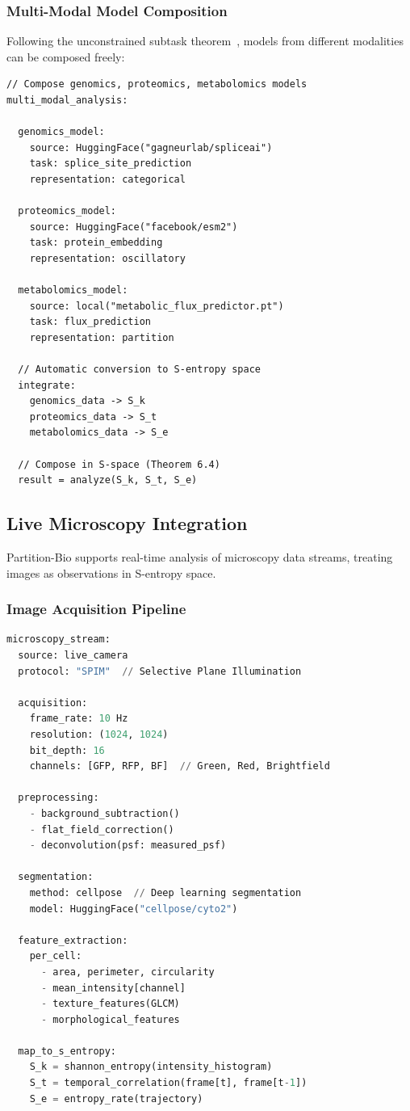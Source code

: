 \documentclass[12pt,a4paper]{article}
\begin{document}
\subsubsection{Multi-Modal Model Composition}

Following the unconstrained subtask theorem~\cite{sachikonye2026sentropy}, models from different modalities can be composed freely:

\begin{lstlisting}[basicstyle=\ttfamily\small]
// Compose genomics, proteomics, metabolomics models
multi_modal_analysis:
  
  genomics_model:
    source: HuggingFace("gagneurlab/spliceai")
    task: splice_site_prediction
    representation: categorical
  
  proteomics_model:
    source: HuggingFace("facebook/esm2")
    task: protein_embedding
    representation: oscillatory
  
  metabolomics_model:
    source: local("metabolic_flux_predictor.pt")
    task: flux_prediction
    representation: partition
  
  // Automatic conversion to S-entropy space
  integrate:
    genomics_data -> S_k
    proteomics_data -> S_t
    metabolomics_data -> S_e
    
  // Compose in S-space (Theorem 6.4)
  result = analyze(S_k, S_t, S_e)
\end{lstlisting}

\subsection{Live Microscopy Integration}

Partition-Bio supports real-time analysis of microscopy data streams, treating images as observations in S-entropy space.

\subsubsection{Image Acquisition Pipeline}

\begin{lstlisting}[language=Python, basicstyle=\ttfamily\small]
microscopy_stream:
  source: live_camera
  protocol: "SPIM"  // Selective Plane Illumination
  
  acquisition:
    frame_rate: 10 Hz
    resolution: (1024, 1024)
    bit_depth: 16
    channels: [GFP, RFP, BF]  // Green, Red, Brightfield
  
  preprocessing:
    - background_subtraction()
    - flat_field_correction()
    - deconvolution(psf: measured_psf)
  
  segmentation:
    method: cellpose  // Deep learning segmentation
    model: HuggingFace("cellpose/cyto2")
    
  feature_extraction:
    per_cell:
      - area, perimeter, circularity
      - mean_intensity[channel]
      - texture_features(GLCM)
      - morphological_features
  
  map_to_s_entropy:
    S_k = shannon_entropy(intensity_histogram)
    S_t = temporal_correlation(frame[t], frame[t-1])
    S_e = entropy_rate(trajectory)
\end{lstlisting}
\end{document}
